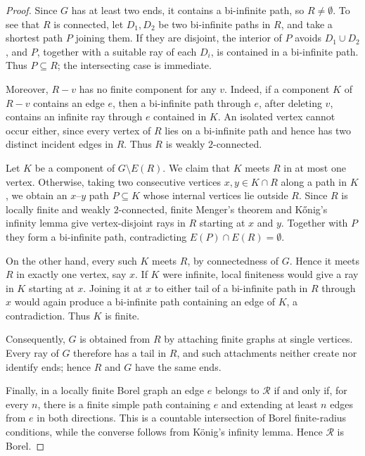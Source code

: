 \documentclass{article}
\theoremstyle{plain}
\theoremstyle{definition}
\newcommand{\cR}{\mathcal{R}}
\begin{document}
\begin{proof}
Since $G$ has at least two ends, it contains a bi-infinite path, so $R\neq\emptyset$. To see that $R$ is connected, let $D_1,D_2$ be two bi-infinite paths in $R$, and take a shortest path $P$ joining them. If they are disjoint, the interior of $P$ avoids $D_1\cup D_2$, and $P$, together with a suitable ray of each $D_i$, is contained in a bi-infinite path. Thus $P\subseteq R$; the intersecting case is immediate.

Moreover, $R-v$ has no finite component for any $v$. Indeed, if a component $K$ of $R-v$ contains an edge $e$, then a bi-infinite path through $e$, after deleting $v$, contains an infinite ray through $e$ contained in $K$. An isolated vertex cannot occur either, since every vertex of $R$ lies on a bi-infinite path and hence has two distinct incident edges in $R$. Thus $R$ is weakly $2$-connected.

Let $K$ be a component of $G\setminus E(R)$. We claim that $K$ meets $R$ in at most one vertex. Otherwise, taking two consecutive vertices $x,y\in K\cap R$ along a path in $K$, we obtain an $x$--$y$ path $P\subseteq K$ whose internal vertices lie outside $R$. Since $R$ is locally finite and weakly $2$-connected, finite Menger's theorem and Kőnig's infinity lemma give vertex-disjoint rays in $R$ starting at $x$ and $y$. Together with $P$ they form a bi-infinite path, contradicting $E(P)\cap E(R)=\emptyset$.

On the other hand, every such $K$ meets $R$, by connectedness of $G$. Hence it meets $R$ in exactly one vertex, say $x$. If $K$ were infinite, local finiteness would give a ray in $K$ starting at $x$. Joining it at $x$ to either tail of a bi-infinite path in $R$ through $x$ would again produce a bi-infinite path containing an edge of $K$, a contradiction. Thus $K$ is finite.

Consequently, $G$ is obtained from $R$ by attaching finite graphs at single vertices. Every ray of $G$ therefore has a tail in $R$, and such attachments neither create nor identify ends; hence $R$ and $G$ have the same ends.

Finally, in a locally finite Borel graph an edge $e$ belongs to $\cR$ if and only if, for every $n$, there is a finite simple path containing $e$ and extending at least $n$ edges from $e$ in both directions. This is a countable intersection of Borel finite-radius conditions, while the converse follows from K\"onig's infinity lemma. Hence $\cR$ is Borel.
\end{proof}
\end{document}
